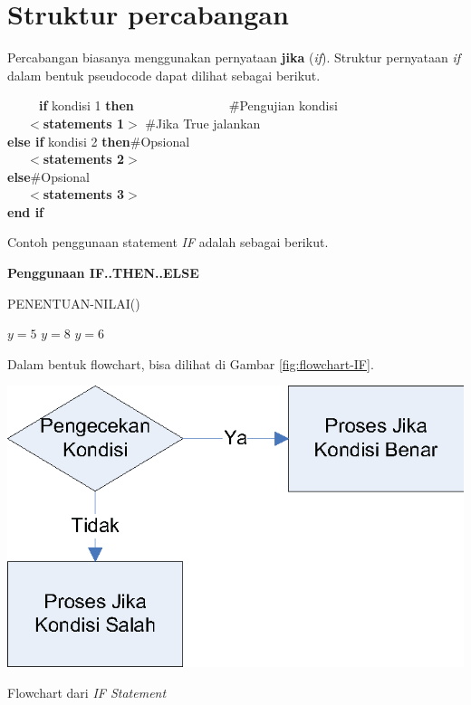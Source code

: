 \section{Struktur percabangan}
Percabangan biasanya menggunakan pernyataan \textbf{jika} (\textit{if}). Struktur pernyataan \textit{if} dalam bentuk pseudocode dapat dilihat sebagai berikut.

\begin{tabbing}
~~~~~\=\textbf{if} kondisi 1 \textbf{then}~~~~~~~~~~~~~~~\=\#Pengujian kondisi\\
\>~~~$<$\textbf{statements 1}$>$ \> \#Jika True jalankan\\
\>\textbf{else if } kondisi 2 \textbf{then}\>\#Opsional\\
\>~~~$<$\textbf{statements 2}$>$\>\\
\>\textbf{else}\>\#Opsional\\
\>~~~$<$\textbf{statements 3}$>$\>\\
\>\textbf{end if}
\end{tabbing}

\FloatBarrier
Contoh penggunaan statement \textit{IF} adalah sebagai berikut.

\begin{contoh}
	\textbf{Penggunaan IF..THEN..ELSE}
	\begin{algorithm}[H]
		\caption{PENENTUAN-NILAI()}
		\begin{algorithmic}[1]
			\STATE $y = 5$ 
			\STATE $y = 8$ 
		\ELSE
			\STATE $y = 6$ 
		\ENDIF
		\end{algorithmic}
	\end{algorithm}
\end{contoh}


Dalam bentuk flowchart, bisa dilihat di Gambar \ref{fig:flowchart-IF}.

\begin{marginfigure}%
\includegraphics[scale=0.6]{fig/flowchart-IF.eps}%
\caption{Flowchart dari \textit{IF Statement}}%
\label{fig:flowchart-IF}%
\end{marginfigure}

